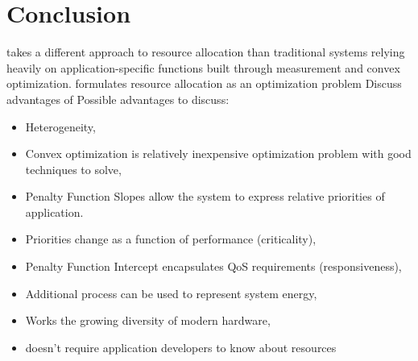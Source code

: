 \section{Conclusion}\label{conclusion}

\pacora takes a different approach to resource allocation than traditional systems relying heavily on application-specific functions built through measurement and convex optimization. \pacora formulates resource allocation as an optimization problem 
Discuss advantages of \pacora
Possible advantages to discuss:
\begin{itemize}
\item Heterogeneity,
\item Convex optimization is relatively inexpensive optimization problem with good techniques to solve,
\item Penalty Function Slopes allow the system to express relative priorities of application.
\item Priorities change as a function of performance (criticality),
\item Penalty Function Intercept encapsulates QoS requirements (responsiveness),
\item Additional process can be used to represent system energy,
\item Works the growing diversity of modern hardware,
\item doesn't require application developers to know about resources
\end{itemize}
